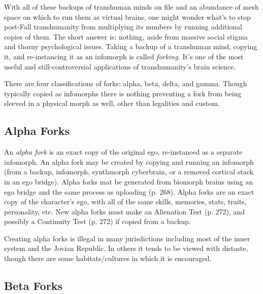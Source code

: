 With all of these backups of transhuman minds on 
file and an abundance of mesh space on which to run 
them as virtual brains, one might wonder what's to 
stop post-Fall transhumanity from multiplying its 
numbers by running additional copies of them. The 
short answer is: nothing, aside from massive social 
stigma and thorny psychological issues. Taking a 
backup of a transhuman mind, copying it, and re-instancing
it as an infomorph is called \textit{forking.} It's one
of the most useful and still-controversial applications 
of transhumanity's brain science.

There are four classifications of forks: alpha, beta, 
delta, and gamma. Though typically copied as infomorphs
there is nothing preventing a fork from being
sleeved in a physical morph as well, other than legalities
and custom.

\subsection{Alpha Forks}

An \textit{alpha fork} is an exact copy of the original ego, 
re-instanced as a separate infomorph. An alpha fork 
may be created by copying and running an infomorph 
(from a backup, infomorph, synthmorph cyberbrain, 
or a removed cortical stack in an ego bridge). Alpha 
forks mat be generated from biomorph brains using 
an ego bridge and the same process as uploading (p. 
268). Alpha forks are an exact copy of the character's
ego, with all of the same skills, memories, stats,
traits, personality, etc. New alpha forks must make 
an Alienation Test (p. 272), and possibly a Continuity 
Test (p. 272) if copied from a backup.

Creating alpha forks is illegal in many jurisdictions
including most of the inner system and the
Jovian Republic. In others it tends to be viewed with 
distaste, though there are some habitats/cultures in 
which it is encouraged.

\subsection{Beta Forks}

